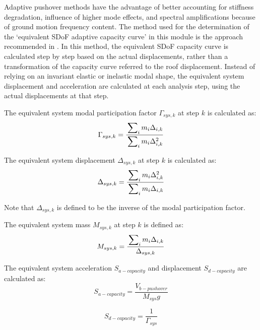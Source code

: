 Adaptive pushover methods have the advantage of better accounting for stiffness degradation, influence of higher mode effects, and spectral amplifications because of ground motion frequency content. The method used for the determination of the ‘equivalent SDoF adaptive capacity curve’ in this module is the approach recommended in \citet{Casarotti2007a}. In this method, the equivalent SDoF capacity curve is calculated step by step based on the actual displacements, rather than a transformation of the capacity curve referred to the roof displacement. Instead of relying on an invariant elastic or inelastic modal shape, the equivalent system displacement and acceleration are calculated at each analysis step, using the actual displacements at that step.

The equivalent system modal participation factor $\Gamma_{sys, k}$ at step $k$ is calculated as:
\begin{equation}
	\Gamma_{sys,k} = \frac{\sideset{}{_i}\sum m_i \Delta_{i,k}}{\sideset{}{_i}\sum m_i \Delta_{i,k}^2}
\end{equation}

The equivalent system displacement $\Delta_{sys,k}$ at step $k$ is calculated as:
\begin{equation}
	\Delta_{sys,k} = \frac{\sideset{}{_i}\sum m_i \Delta_{i,k}^2}{\sideset{}{_i}\sum m_i \Delta_{i,k}}
\end{equation}

Note that $\Delta_{sys,k}$ is defined to be the inverse of the modal participation factor.

The equivalent system mass $M_{sys,k}$ at step $k$ is defined as:
\begin{equation}
	M_{sys,k} = \frac{\sideset{}{_i}\sum m_i \Delta_{i,k}}{\Delta_{sys,k}}
\end{equation}

The equivalent system acceleration $S_{a-capacity}$ and displacement $S_{d-capacity}$ are calculated as:
\begin{equation}
	S_{a-capacity} = \frac{V_{b-pushover}}{M_{sys} g}
\end{equation}

\begin{equation}
	S_{d-capacity} = \frac{1}{\Gamma_{sys}}
\end{equation}